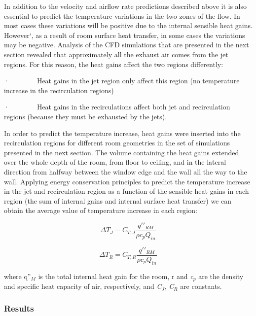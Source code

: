 In addition to the velocity and airflow rate predictions described above it is also essential to predict the temperature variations in the two zones of the flow. In most cases these variations will be positive due to the internal sensible heat gains. However`, as a result of room surface heat transfer, in some cases the variations may be negative. Analysis of the CFD simulations that are presented in the next section revealed that approximately all the exhaust air comes from the jet regions. For this reason, the heat gains affect the two regions differently:

·~~~~~~~~Heat gains in the jet region only affect this region (no temperature increase in the recirculation regions)

·~~~~~~~~Heat gains in the recirculations affect both jet and recirculation regions (because they must be exhausted by the jets).

In order to predict the temperature increase, heat gains were inserted into the recirculation regions for different room geometries in the set of simulations presented in the next section. The volume containing the heat gains extended over the whole depth of the room, from floor to ceiling, and in the lateral direction from halfway between the window edge and the wall all the way to the wall. Applying energy conservation principles to predict the temperature increase in the jet and recirculation region as a function of the sensible heat gains in each region (the sum of internal gains and internal surface heat transfer) we can obtain the average value of temperature increase in each region:

\begin{equation}
\Delta {T_J} = {C_{T,J}}\frac{{q'{'_{RM}}}}{{\rho {c_p}{Q_{in}}}}
\end{equation}

\begin{equation}
\Delta {T_R} = {C_{T,R}}\frac{{q'{'_{RM}}}}{{\rho {c_p}{Q_{in}}}}
\end{equation}

where q''\(_{M}\) is the total internal heat gain for the room, r and \emph{c}\(_{p}\) are the density and specific heat capacity of air, respectively, and \emph{C}\(_{J}\), \emph{C}\(_{R}\) are constants.

\subsubsection{Results}\label{results}

